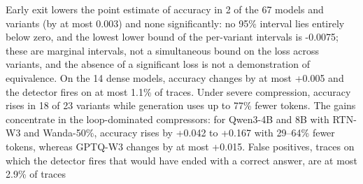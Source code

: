 Early exit lowers the point estimate of accuracy in 2 of the 67 models and variants (by at most 0.003) and none significantly: no 95\% interval lies entirely below zero, and the lowest lower bound of the per-variant intervals is -0.0075; these are marginal intervals, not a simultaneous bound on the loss across variants, and the absence of a significant loss is not a demonstration of equivalence. On the 14 dense models, accuracy changes by at most +0.005 and the detector fires on at most 1.1\% of traces. Under severe compression, accuracy rises in 18 of 23 variants while generation uses up to 77\% fewer tokens. The gains concentrate in the loop-dominated compressors: for Qwen3-4B and 8B with RTN-W3 and Wanda-50\%, accuracy rises by +0.042 to +0.167 with 29--64\% fewer tokens, whereas GPTQ-W3 changes by at most +0.015. False positives, traces on which the detector fires that would have ended with a correct answer, are at most 2.9\% of traces%

